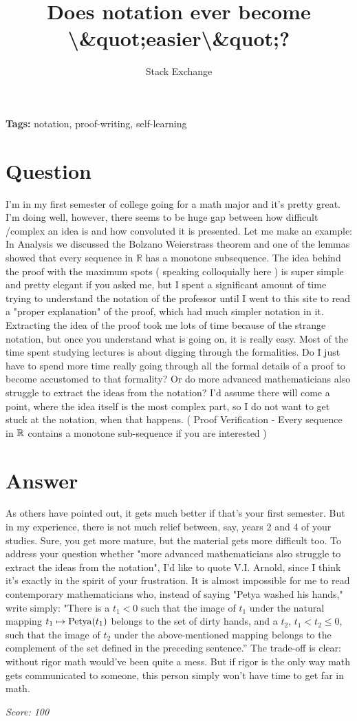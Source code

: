\documentclass{article}
\title{Does notation ever become \textbackslash{}&quot;easier\textbackslash{}&quot;?}
\author{Stack Exchange}
\date{}
\begin{document}
\maketitle

\noindent\textbf{Tags:} notation, proof-writing, self-learning

\section*{Question}
I'm in my first semester of college going for a math major and it's pretty great. I'm doing well, however, there seems to be huge gap between how difficult /complex an idea is and how convoluted it is presented. Let me make an example: In Analysis we discussed the Bolzano Weierstrass theorem and one of the lemmas showed that every sequence in $\mathbb{R}$ has a monotone subsequence. The idea behind the proof with the maximum spots ( speaking colloquially here ) is super simple and pretty elegant if you asked me, but I spent a significant amount of time trying to understand the notation of the professor until I went to this site to read a "proper explanation" of the proof, which had much simpler notation in it. Extracting the idea of the proof took me lots of time because of the strange notation, but once you understand what is going on, it is really easy. Most of the time spent studying lectures is about digging through the formalities. Do I just have to spend more time really going through all the formal details of a proof to become accustomed to that formality? Or do more advanced mathematicians also struggle to extract the ideas from the notation? I'd assume there will come a point, where the idea itself is the most complex part, so I do not want to get stuck at the notation, when that happens. ( Proof Verification - Every sequence in $\Bbb R$ contains a monotone sub-sequence if you are interested )

\section*{Answer}
As others have pointed out, it gets much better if that's your first semester. But in my experience, there is not much relief between, say, years 2 and 4 of your studies. Sure, you get more mature, but the material gets more difficult too. To address your question whether "more advanced mathematicians also struggle to extract the ideas from the notation", I'd like to quote V.I. Arnold, since I think it's exactly in the spirit of your frustration. It is almost impossible for me to read contemporary mathematicians who, instead of saying "Petya washed his hands," write simply: "There is a $t_1<0$ such that the image of $t_1$ under the natural mapping $t_1 \mapsto {\rm Petya}(t_1)$ belongs to the set of dirty hands, and a $t_2$, $t_1<t_2 \leq 0$, such that the image of $t_2$ under the above-mentioned mapping belongs to the complement of the set defined in the preceding sentence.'' The trade-off is clear: without rigor math would've been quite a mess. But if rigor is the only way math gets communicated to someone, this person simply won't have time to get far in math.

\vspace{1em}
\noindent\textit{Score: 100}
\end{document}
